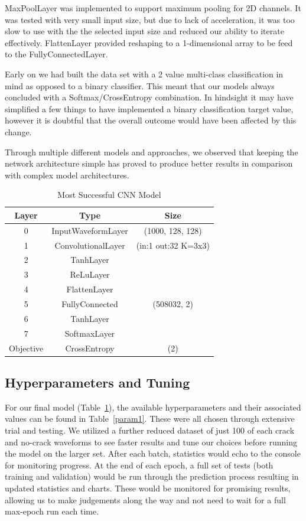 \documentclass[conference]{IEEEtran}
\begin{document}
MaxPoolLayer was implemented to support maximum pooling for 2D channels. It was tested with very small input size, but due to lack of acceleration, it was too slow to use with the the selected input size and reduced our ability to iterate effectively. FlattenLayer provided reshaping to a 1-dimensional array to be feed to the FullyConnectedLayer.

Early on we had built the data set with a 2 value multi-class classification in mind as opposed to a binary classifier. This meant that our models always concluded with a Softmax/CrossEntropy combination. In hindsight it may have simplified a few things to have implemented a binary classification target value, however it is doubtful that the overall outcome would have been affected by this change.

Through multiple different models and approaches, we observed that keeping the network architecture simple has proved to produce better results in comparison with complex model architectures.

\begin{table}[htbp]
\caption{Most Successful CNN Model}
\begin{center}
\begin{tabular}{|c|c|c|}
\hline
\textbf{Layer}&\textbf{Type}&\textbf{Size} \\
\cline{2-3} 
\hline
 0 & InputWaveformLayer & (1000, 128, 128) \\
 1 & ConvolutionalLayer & (in:1 out:32 K=3x3) \\
 2 & TanhLayer & \\
 3 & ReLuLayer & \\
 4 & FlattenLayer & \\
 5 & FullyConnected & (508032, 2) \\
 6 & TanhLayer & \\
 7 & SoftmaxLayer & \\
Objective & CrossEntropy & (2)\\

\hline
\end{tabular}
\label{tab2}
\end{center}
\end{table}

\subsection{Hyperparameters and Tuning}\label{AA}

For our final model (Table~\ref{tab2}), the available hyperparameters and their associated values can be found in Table~\ref{param1}. These were all chosen through extensive trial and testing. We utilized a further reduced dataset of just 100 of each crack and no-crack waveforms to see faster results and tune our choices before running the model on the larger set. After each batch, statistics would echo to the console for monitoring progress. At the end of each epoch, a full set of tests (both training and validation) would be run through the prediction process resulting in updated statistics and charts. These would be monitored for promising results, allowing us to make judgements along the way and not need to wait for a full max-epoch run each time. 
\end{document}
